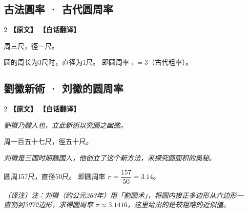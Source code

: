 \documentclass[11pt,a4paper]{article}
\newcommand{\noteMOD}[1]{\par\textcolor{notecolor}{\small\textit{〔译注〕#1}}\par\smallskip}
\begin{document}
\medskip

\subsection{古法圓率 · 古代圆周率}

\begin{paracol}{2}
\noindent\textbf{\textcolor{leftlabel}{【原文】}}
\switchcolumn
\noindent\textbf{\textcolor{rightlabel}{【白话翻译】}}
\switchcolumn*

周三尺，徑一尺。

\switchcolumn

圆的周长为3尺时，直径为1尺。\break
即圆周率 $\pi = 3$（古代粗率）。

\end{paracol}

\medskip

\subsection{劉徽新術 · 刘徽的圆周率}

\begin{paracol}{2}
\noindent\textbf{\textcolor{leftlabel}{【原文】}}
\switchcolumn
\noindent\textbf{\textcolor{rightlabel}{【白话翻译】}}
\switchcolumn*

\textit{劉徽乃魏人也，立此新術以究圓之幽微。}

\medskip

周一百五十七尺，徑五十尺。

\switchcolumn

\textit{刘徽是三国时期魏国人，他创立了这个新方法，来探究圆面积的奥秘。}

\medskip

圆周157尺，直径50尺。\break
即圆周率 $\pi = \dfrac{157}{50} = 3.14$。

\noteMOD{注：刘徽（约公元263年）用「割圆术」，将圆内接正多边形从六边形一直割到3072边形，求得圆周率 $\pi \approx 3.1416$，这里给出的是较粗略的近似值。}

\end{paracol}

\medskip

\end{document}
